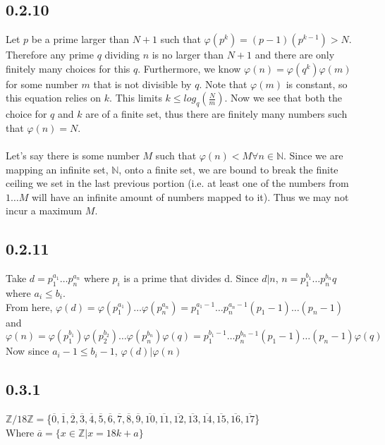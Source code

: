\documentclass[11pt]{article}
\begin{document}
	\subsection*{0.2.10}
		Let $p$ be a prime larger than $N+1$ such that $\varphi(p^k) = (p-1)(p^{k-1}) > N$.  Therefore any prime $q$ dividing $n$ is no larger than $N+1$ and there are only
		finitely many choices for this $q$. Furthermore, we know $\varphi(n) = \varphi(q^k)\varphi(m)$ for some number $m$ that is not divisible by $q$.  Note that $\varphi(m)$ is 
		constant, so this equation relies on $k$.  This limits $k \leq log_q(\frac{N}{m})$.  Now we see that both the choice for $q$ and $k$ are of a finite set, thus there are finitely
		many numbers such that $\varphi(n) = N$.\\ 
		\\
		Let's say there is some number $M$ such that $\varphi(n) < M \forall n \in \mathbb{N}$.  Since we are mapping an infinite set, $\mathbb{N}$, onto a finite set, we are bound to
		break the finite ceiling we set in the last previous portion (i.e. at least one of the numbers from $1\dots M$ will have an infinite amount of numbers mapped to it).  Thus we
		may not incur a maximum $M$.
	\subsection*{0.2.11}
		Take $d = p_1^{a_1} \dots p_n^{a_n}$ where $p_i$ is a prime that divides d.  Since $d|n$, $n = p_1^{b_1} \dots p_n^{b_n}q$ where $a_i \leq b_i$.\\
	  	From here, $\varphi(d) = \varphi(p_1^{a_1}) \dots \varphi(p_n^{a_n}) = p_1^{a_1 - 1} \dots p_n^{a_n - 1}(p_1 - 1) \dots (p_n - 1)$ and \\ 
		$\varphi(n) = \varphi(p_1^{b_1})\varphi(p_2^{b_2}) \dots \varphi(p_n^{b_n})\varphi(q) = p_1^{b_1 - 1} \dots p_n^{b_n - 1}(p_1 - 1) \dots (p_n - 1) \varphi(q)$\\
		Now since $a_i - 1 \leq b_i - 1$, $\varphi(d)|\varphi(n)$

	\subsection*{0.3.1}
		$\mathbb{Z}/18\mathbb{Z} =$\{$\overline{0},\overline{1},\overline{2},\overline{3},\overline{4},\overline{5},\overline{6},\overline{7},\overline{8},\overline{9},
		\overline{10},\overline{11},\overline{12},\overline{13},\overline{14},\overline{15},\overline{16},\overline{17}$\}\\
		Where $\overline a = \{ x \in \mathbb{Z} | x = 18k + a  \}$
\end{document}
